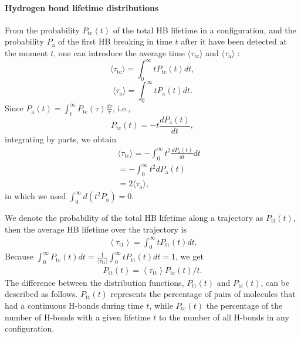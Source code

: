 {\paragraph{Hydrogen bond lifetime distributions}\label{diff_distr}
From the probability $P_\text{tc}(t)$ of the total HB lifetime in a configuration, and the probability $P_\text{a}$ of 
the first HB breaking in time $t$ after it have been detected at the moment $t$, one can introduce the average time 
$\langle \tau_\text{tc}\rangle$ and $\langle \tau_\text{a}\rangle$ :
\begin{equation}
\langle \tau_\text{tc}\rangle = \int_0^\infty t P_\text{tc}(t) dt,
\label{eq:tau_tc}
\end{equation}
\begin{equation}
\langle \tau_\text{a}\rangle = \int_0^\infty t P_\text{a}(t) dt. 
\label{eq:tau_a}
\end{equation}
Since $P_{\mathrm{a}}(t)=\int_{t}^{\infty} P_{\mathrm{tc}}(\tau) \frac{d \tau}{\tau}$, i.e., 
\begin{equation}
P_\text{tc}(t) = -t\frac{dP_\text{a}(t)}{dt}, \nonumber
\label{eq:relation_Ptc--Pa}
\end{equation}
integrating by parts, we obtain
\begin{eqnarray}
&&\langle \tau_\text{tc}\rangle = -\int_0^\infty t^2 \frac{dP_{\mathrm{a}}(t)}{dt}dt \nonumber \\
%
&&= -\int_0^\infty t^2 dP_\text{a}(t) \nonumber\\
&&= 2\langle \tau_\text{a}\rangle,\nonumber
\end{eqnarray}
in which we used $\int_0^\infty d(t^2 P_\text{a})=0$.

We denote the probability of the total HB lifetime along a trajectory as $P_{\mathrm{tt}}(t)$,
then the average HB lifetime over the trajectory is
\begin{eqnarray}
\left\langle\tau_{\mathrm{tt}}\right\rangle=\int_{0}^{\infty} t P_{\mathrm{tt}}(t) d t.
\label{eq:relation_tau_tt}
\end{eqnarray}
Because $\int_{0}^{\infty} P_{\mathrm{tc}}(t) d t=\frac{1}{\langle \tau_\text{tt}\rangle} \int_{0}^{\infty} t P_{\mathrm{tt}}(t) d t = 1$, 
we get 
\begin{eqnarray}
P_{\mathrm{tt}}(t)=\left\langle \tau_{\mathrm{tt}}\right\rangle P_{\mathrm{tc}}(t) / t.
\label{eq:relation_P_tt--P_tc}
\end{eqnarray}
The difference between the distribution functions, $P_{\mathrm{tt}}(t)$ and $P_{\mathrm{tc}}(t)$, can be described as follows.
$P_{\mathrm{tt}}(t)$ represents the percentage of pairs of molecules that had a continuous H-bonds during time $t$, 
while $P_{\mathrm{tc}}(t)$ the percentage of the number of H-bonds with a given lifetime $t$ 
to the number of all H-bonds in any configuration\cite{Voloshin2009}.

}
